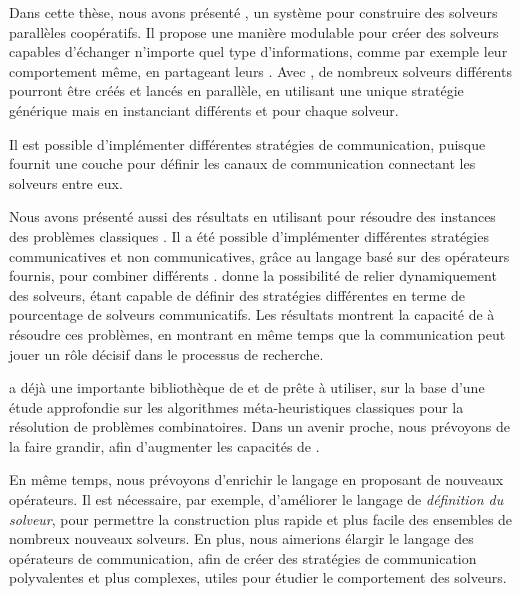 Dans cette thèse, nous avons présenté \posl{}, un système pour construire des solveurs parallèles coopératifs. Il propose une manière modulable  pour créer des solveurs capables d'échanger n'importe quel type d'informations, comme par exemple leur comportement même, en partageant
leurs \infr{\oms}. Avec \posl{}, de nombreux solveurs différents pourront être créés et lancés en parallèle, en utilisant une unique stratégie générique mais en instanciant différents \infr{\oms{}} et \infr{\opchs{}} pour chaque solveur. 

Il est possible d'implémenter différentes stratégies de communication, puisque \posl{} fournit une couche pour définir les canaux de communication connectant les solveurs entre eux.

Nous avons présenté aussi des résultats en utilisant \posl{} pour résoudre des instances des problèmes classiques \csp. Il a été possible d'implémenter différentes stratégies communicatives et non communicatives, grâce au langage basé sur des opérateurs fournis, pour combiner différents \infr{\oms{}}. \posl{} donne la possibilité de relier dynamiquement des solveurs, étant capable de définir des stratégies différentes en terme de pourcentage de solveurs communicatifs. Les résultats montrent la capacité de \posl{} à résoudre ces problèmes, en montrant en même temps que la communication peut jouer un rôle décisif dans le processus de recherche.

\posl{} a déjà une importante bibliothèque de \infr{\oms{}} et de \infr{\opchs{}} prête à utiliser, sur la base d'une étude approfondie sur les algorithmes méta-heuristiques classiques pour la résolution de problèmes combinatoires. Dans un avenir proche, nous prévoyons de la faire grandir, afin d'augmenter les capacités de \posl.

En même temps, nous prévoyons d'enrichir le langage en proposant de nouveaux opérateurs. Il est nécessaire, par exemple, d'améliorer le langage de {\it définition du solveur}, pour permettre la construction plus rapide et plus facile des ensembles de nombreux nouveaux solveurs. En plus, nous aimerions élargir le langage des opérateurs de communication, afin de créer des stratégies de communication polyvalentes et plus complexes, utiles pour étudier le comportement des solveurs.